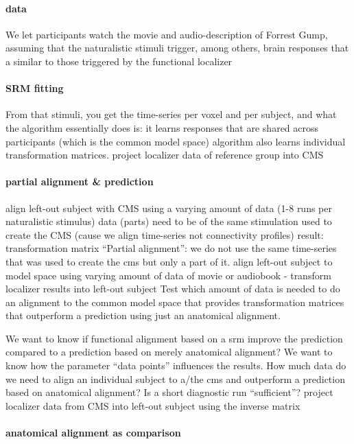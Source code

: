 \paragraph{data}
%
We let participants watch the movie and audio-description of Forrest Gump,
assuming that the naturalistic stimuli trigger, among others, brain responses
that a similar to those triggered by the functional localizer


\paragraph{SRM fitting}

%
From that stimuli, you get the time-series per voxel and per subject, and what
the algorithm essentially does is: it learns responses that are shared across
participants (which is the common model space)
%
algorithm also learns individual transformation matrices.
%
project localizer data of reference group into CMS


\paragraph{partial alignment \& prediction}

%
align left-out subject with CMS using a varying amount of data (1-8 runs per
naturalistic stimulus) data (parts) need to be of the same stimulation used to
create the CMS (cause we align time-series not connectivity profiles) result:
transformation matrix
%
``Partial alignment'': we do not use the same time-series that was used to
create the \ac{cms} but only a part of it.
%
align left-out subject to model space using varying amount of data of
movie or audiobook - transform localizer results into left-out subject
%
Test which amount of data is needed to do an alignment to the common
model space that provides transformation matrices that outperform a prediction
using just an anatomical alignment.

%
We want to know if functional alignment based on a \ac{srm} improve the
prediction compared to a prediction based on merely anatomical alignment?
%
We want to know how the parameter ``data points'' influences the results.
%
How much data do we need to align an individual subject to a/the \ac{cms} and
outperform a prediction based on anatomical alignment?
%
Is a short diagnostic run ``sufficient''?
%
project localizer data from CMS into left-out subject using the inverse matrix


\paragraph{anatomical alignment as comparison}

